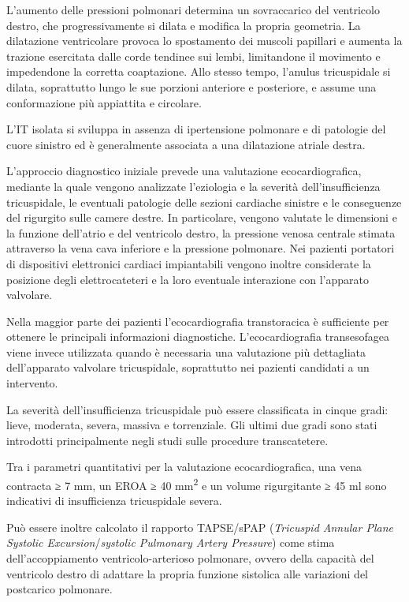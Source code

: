 \documentclass[12pt,a4paper,twoside]{article}
\begin{document}
L'aumento delle pressioni polmonari determina un sovraccarico del ventricolo destro, che progressivamente si dilata e modifica la propria geometria. La dilatazione ventricolare provoca lo spostamento dei muscoli papillari e aumenta la trazione esercitata dalle corde tendinee sui lembi, limitandone il movimento e impedendone la corretta coaptazione. Allo stesso tempo, l'anulus tricuspidale si dilata, soprattutto lungo le sue porzioni anteriore e posteriore, e assume una conformazione più appiattita e circolare. \cite{ref12}

L'IT isolata si sviluppa in assenza di ipertensione polmonare e di patologie del cuore sinistro ed è generalmente associata a una dilatazione atriale destra. \cite{ref10,ref12}

L'approccio diagnostico iniziale prevede una valutazione ecocardiografica, mediante la quale vengono analizzate l'eziologia e la severità dell'insufficienza tricuspidale, le eventuali patologie delle sezioni cardiache sinistre e le conseguenze del rigurgito sulle camere destre. In particolare, vengono valutate le dimensioni e la funzione dell'atrio e del ventricolo destro, la pressione venosa centrale stimata attraverso la vena cava inferiore e la pressione polmonare. Nei pazienti portatori di dispositivi elettronici cardiaci impiantabili vengono inoltre considerate la posizione degli elettrocateteri e la loro eventuale interazione con l'apparato valvolare. \cite{ref10}

Nella maggior parte dei pazienti l'ecocardiografia transtoracica è sufficiente per ottenere le principali informazioni diagnostiche. L'ecocardiografia transesofagea viene invece utilizzata quando è necessaria una valutazione più dettagliata dell'apparato valvolare tricuspidale, soprattutto nei pazienti candidati a un intervento. \cite{ref10}

La severità dell'insufficienza tricuspidale può essere classificata in cinque gradi: lieve, moderata, severa, massiva e torrenziale. Gli ultimi due gradi sono stati introdotti principalmente negli studi sulle procedure transcatetere. \cite{ref10}

Tra i parametri quantitativi per la valutazione ecocardiografica, una vena contracta ≥ 7 mm, un EROA ≥ 40 mm\textsuperscript{2} e un volume rigurgitante ≥ 45 ml sono indicativi di insufficienza tricuspidale severa. \cite{ref13}

Può essere inoltre calcolato il rapporto TAPSE/sPAP (\emph{Tricuspid Annular Plane Systolic Excursion}/\emph{systolic Pulmonary Artery Pressure}) come stima dell'accoppiamento ventricolo-arterioso polmonare, ovvero della capacità del ventricolo destro di adattare la propria funzione sistolica alle variazioni del postcarico polmonare. \cite{ref10}
\end{document}
